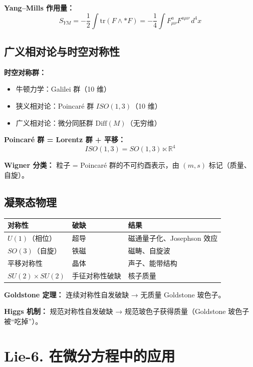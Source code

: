 \textbf{Yang--Mills 作用量：}
\[
S_{YM} = -\frac{1}{2}\int \text{tr}(F \wedge *F) = -\frac{1}{4}\int F_{\mu\nu}^a F^{a\mu\nu}\,d^4x
\]

\subsection{广义相对论与时空对称性}

\textbf{时空对称群：}
\begin{itemize}
  \item 牛顿力学：Galilei 群（10 维）
  \item 狭义相对论：Poincaré 群 $ISO(1,3)$（10 维）
  \item 广义相对论：微分同胚群 $\text{Diff}(M)$（无穷维）
\end{itemize}

\textbf{Poincaré 群 = Lorentz 群 + 平移：}
\[
ISO(1,3) = SO(1,3) \ltimes \mathbb{R}^4
\]

\textbf{Wigner 分类：} 粒子 = Poincaré 群的不可约酉表示，由 $(m, s)$ 标记（质量、自旋）。

\subsection{凝聚态物理}

\begin{center}
\begin{tabular}{L{4cm}L{4cm}L{4cm}}
\toprule
\textbf{对称性} & \textbf{破缺} & \textbf{结果} \\
\midrule
$U(1)$（相位） & 超导 & 磁通量子化、Josephson 效应 \\
$SO(3)$（自旋） & 铁磁 & 磁畴、自旋波 \\
平移对称性 & 晶体 & 声子、能带结构 \\
$SU(2) \times SU(2)$ & 手征对称性破缺 & 核子质量 \\
\bottomrule
\end{tabular}
\end{center}

\textbf{Goldstone 定理：} 连续对称性自发破缺 → 无质量 Goldstone 玻色子。

\textbf{Higgs 机制：} 规范对称性自发破缺 → 规范玻色子获得质量（Goldstone 玻色子被“吃掉”）。

\section{Lie-6. 在微分方程中的应用}

